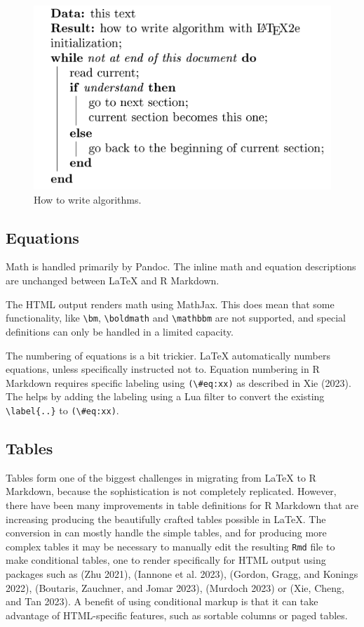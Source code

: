\begin{figure}

{\centering \includegraphics[width=0.6\linewidth]{figures/alghow} 

}

\caption{How to write algorithms.}\label{fig:alghow}
\end{figure}

\hypertarget{equations}{%
\subsection{Equations}\label{equations}}

Math is handled primarily by Pandoc. The inline math and equation descriptions are unchanged between LaTeX and R Markdown.

The HTML output renders math using MathJax. This does mean that some functionality, like \texttt{\textbackslash{}bm}, \texttt{\textbackslash{}boldmath} and \texttt{\textbackslash{}mathbbm} are not supported, and special definitions can only be handled in a limited capacity.

The numbering of equations is a bit trickier. LaTeX automatically numbers equations, unless specifically instructed not to. Equation numbering in R Markdown requires specific labeling using \texttt{(\textbackslash{}\#eq:xx)} as described in Xie (2023). The  helps by adding the labeling using a Lua filter to convert the existing \texttt{\textbackslash{}label\{..\}} to \texttt{(\textbackslash{}\#eq:xx)}.

\hypertarget{tables}{%
\subsection{Tables}\label{tables}}

Tables form one of the biggest challenges in migrating from LaTeX to R Markdown, because the sophistication is not completely replicated. However, there have been many improvements in table definitions for R Markdown that are increasing producing the beautifully crafted tables possible in LaTeX. The conversion in  can mostly handle the simple tables, and for producing more complex tables it may be necessary to manually edit the resulting \texttt{Rmd} file to make conditional tables, one to render specifically for HTML output using packages such as  (Zhu 2021),  (Iannone et al. 2023),  (Gordon, Gragg, and Konings 2022),  (Boutaris, Zauchner, and Jomar 2023),  (Murdoch 2023) or  (Xie, Cheng, and Tan 2023). A benefit of using conditional markup is that it can take advantage of HTML-specific features, such as sortable columns or paged tables.

